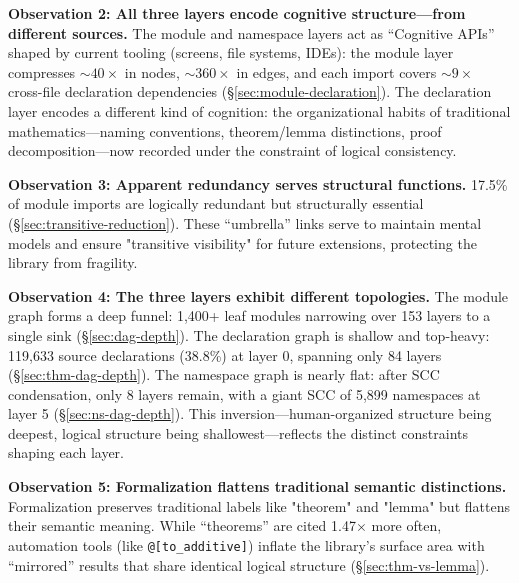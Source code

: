 \begin{finding}
    \textbf{Observation 2: All three layers encode cognitive structure---from different sources.}
    The module and namespace layers act as ``Cognitive APIs'' shaped by current tooling (screens, file systems, IDEs): the module layer compresses ${\sim}40\times$ in nodes, ${\sim}360\times$ in edges, and each import covers ${\sim}9\times$ cross-file declaration dependencies (\S\ref{sec:module-declaration}). The declaration layer encodes a different kind of cognition: the organizational habits of traditional mathematics---naming conventions, theorem/lemma distinctions, proof decomposition---now recorded under the constraint of logical consistency.
\end{finding}

\begin{finding}
    \textbf{Observation 3: Apparent redundancy serves structural functions.}
    17.5\% of module imports are logically redundant but structurally essential (\S\ref{sec:transitive-reduction}). These ``umbrella'' links serve to maintain mental models and ensure "transitive visibility" for future extensions, protecting the library from fragility.
\end{finding}

\begin{finding}
    \textbf{Observation 4: The three layers exhibit different topologies.}
    The module graph forms a deep funnel: 1,400+ leaf modules narrowing over 153 layers to a single sink (\S\ref{sec:dag-depth}). The declaration graph is shallow and top-heavy: 119,633 source declarations (38.8\%) at layer 0, spanning only 84 layers (\S\ref{sec:thm-dag-depth}). The namespace graph is nearly flat: after SCC condensation, only 8 layers remain, with a giant SCC of 5,899 namespaces at layer 5 (\S\ref{sec:ns-dag-depth}). This inversion---human-organized structure being deepest, logical structure being shallowest---reflects the distinct constraints shaping each layer.
\end{finding}

\begin{finding}
    \textbf{Observation 5: Formalization flattens traditional semantic distinctions.}
    Formalization preserves traditional labels like "theorem" and "lemma" but flattens their semantic meaning. While ``theorems'' are cited 1.47$\times$ more often, automation tools (like \texttt{@[to\_additive]}) inflate the library's surface area with ``mirrored'' results that share identical logical structure (\S\ref{sec:thm-vs-lemma}).
\end{finding}

